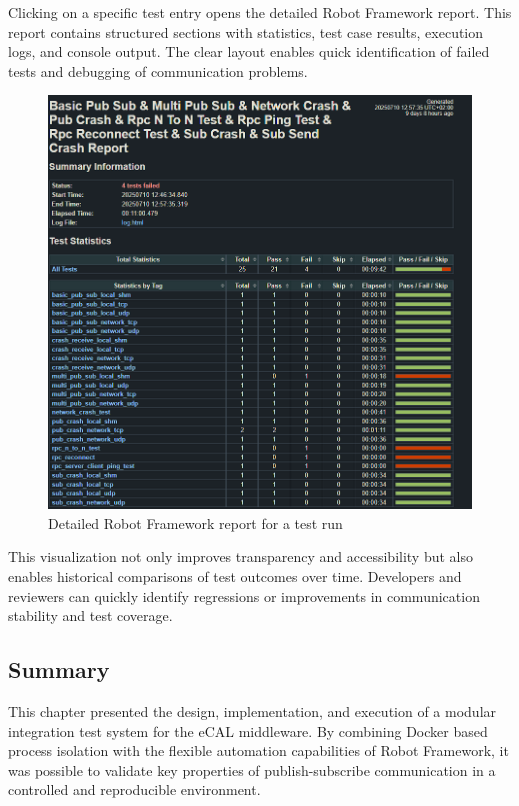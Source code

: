 \vspace{0.5em}
Clicking on a specific test entry opens the detailed Robot Framework report. This report contains structured sections with statistics, test case results, execution logs, and console output. The clear layout enables quick identification of failed tests and debugging of communication problems.

\begin{figure}[H]
	\centering
	\includegraphics[width=\textwidth]{Images/robot_report_example.png}
	\caption{Detailed Robot Framework report for a test run}
	\label{fig:robot_report}
\end{figure}

\vspace{0.5em}
This visualization not only improves transparency and accessibility but also enables historical comparisons of test outcomes over time. Developers and reviewers can quickly identify regressions or improvements in communication stability and test coverage.

\newpage
\subsection{Summary}

This chapter presented the design, implementation, and execution of a modular integration test system for the eCAL middleware. By combining Docker based process isolation with the flexible automation capabilities of Robot Framework, it was possible to validate key properties of publish-subscribe communication in a controlled and reproducible environment.

